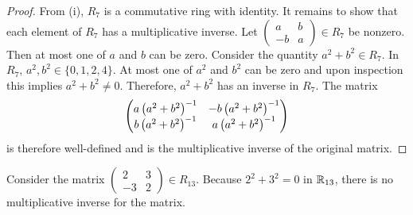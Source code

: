 \documentclass[../AlgebraQualSolutions.tex]{subfiles}
\begin{document}
\begin{proof}
    From (i), $R_7$ is a commutative ring with identity. It remains to show that each element of $R_7$ has a multiplicative inverse. Let $\begin{pmatrix} a & b\\ -b & a\end{pmatrix} \in R_7$ be nonzero. Then at most one of $a$ and $b$ can be zero. Consider the quantity $a^2 + b^2 \in R_7$. In $R_7$, $a^2,b^2 \in \{0, 1, 2, 4\}$. At most one of $a^2$ and $b^2$ can be zero and upon inspection this implies $a^2 + b^2 \neq 0$. Therefore, $a^2 + b^2$ has an inverse in $R_7$. The matrix 
        \[\begin{pmatrix}
            a \left(a^2 + b^2\right)^{-1} & -b \left(a^2 + b^2\right)^{-1}\\
            b\left(a^2 + b^2\right)^{-1} & a\left(a^2 + b^2\right)^{-1}
        \end{pmatrix}\]
    is therefore well-defined and is the multiplicative inverse of the original matrix.
\end{proof}

\begin{solution}
    Consider the matrix $\begin{pmatrix} 2 & 3\\ -3 & 2\end{pmatrix} \in R_{13}$. Because $2^2 + 3^2 = 0$ in $\mathbb{R}_{13}$, there is no multiplicative inverse for the matrix.
\end{solution}
\end{document}
